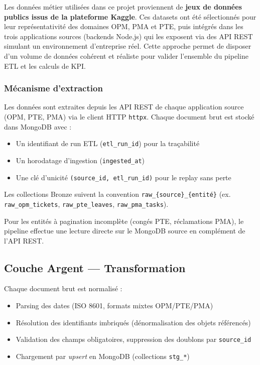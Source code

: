 \documentclass[a4paper,12pt]{article}
\begin{document}
Les données métier utilisées dans ce projet proviennent de \textbf{jeux de données publics
issus de la plateforme Kaggle}. Ces datasets ont été sélectionnés pour leur représentativité
des domaines OPM, PMA et PTE, puis intégrés dans les trois applications sources (backends
Node.js) qui les exposent via des API REST simulant un environnement d'entreprise réel.
Cette approche permet de disposer d'un volume de données cohérent et réaliste pour valider
l'ensemble du pipeline ETL et les calculs de KPI.

\subsubsection{Mécanisme d'extraction}

Les données sont extraites depuis les API REST de chaque application source (OPM, PTE, PMA)
via le client HTTP \texttt{httpx}. Chaque document brut est stocké dans MongoDB avec :
\begin{itemize}[leftmargin=1.5cm]
  \item Un identifiant de run ETL (\texttt{etl\_run\_id}) pour la traçabilité
  \item Un horodatage d'ingestion (\texttt{ingested\_at})
  \item Une clé d'unicité \texttt{(source\_id, etl\_run\_id)} pour le replay sans perte
\end{itemize}

Les collections Bronze suivent la convention \texttt{raw\_\{source\}\_\{entité\}}
(ex. \texttt{raw\_opm\_tickets}, \texttt{raw\_pte\_leaves}, \texttt{raw\_pma\_tasks}).

Pour les entités à pagination incomplète (congés PTE, réclamations PMA), le pipeline
effectue une lecture directe sur le MongoDB source en complément de l'API REST.

\subsection{Couche Argent — Transformation}

Chaque document brut est normalisé :
\begin{itemize}[leftmargin=1.5cm]
  \item Parsing des dates (ISO 8601, formats mixtes OPM/PTE/PMA)
  \item Résolution des identifiants imbriqués (dénormalisation des objets référencés)
  \item Validation des champs obligatoires, suppression des doublons par \texttt{source\_id}
  \item Chargement par \textit{upsert} en MongoDB (collections \texttt{stg\_*})
\end{itemize}
\end{document}
